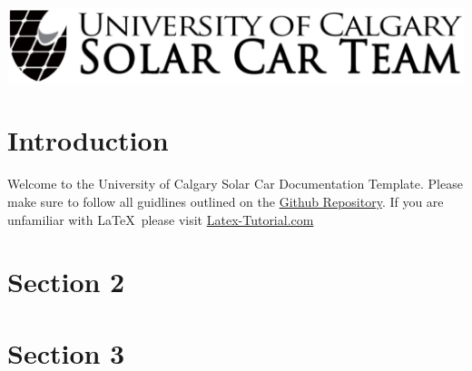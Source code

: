 \begin{titlepage}
    \includegraphics[width=\textwidth]{../Images/Logos/logo-wide.png}\\[1cm] %
     
    
    \vfill %
  
  \end{titlepage}
  
  
  \tableofcontents
  \listoffigures
  \listoftables
  
  
  \section{Introduction}
  Welcome to the University of Calgary Solar Car Documentation Template.
  Please make sure to follow all guidlines outlined on the \href{https://github.com/UCSolarCarTeam/Documentation-Electrical}{Github Repository}.
  If you are unfamiliar with \LaTeX\ please visit \href{https://www.latex-tutorial.com/tutorials/}{Latex-Tutorial.com}
  
  \section{Section 2}
  
  \section{Section 3}
  
  
  
  
  \begin{versionhistory}
  \end{versionhistory}


